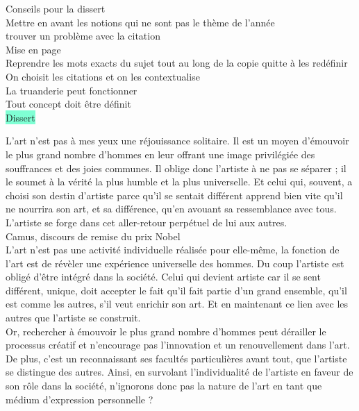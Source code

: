 \documentclass{article}
\begin{document}
\noindent \colorbox{Apricot}{Conseils pour la dissert}\\

\noindent Mettre en avant les notions qui ne sont pas le thème de 
l'année\\ 
trouver un problème avec la citation \\ 
Mise en page \\
Reprendre les mots exacts du sujet tout au long de la copie
quitte à les redéfinir\\ 
On choisit les citations et on les contextualise \\ 
La truanderie peut fonctionner \\ 
Tout concept doit être définit \\ 

\noindent \Large \colorbox{Aquamarine}{Dissert}\\ 

\noindent \large

L’art n’est pas à mes yeux une réjouissance solitaire. 
Il est un moyen d’émouvoir le plus grand nombre d’hommes en leur offrant 
une image privilégiée des souffrances et des joies communes. Il oblige donc
l’artiste à ne pas se séparer ; il le soumet à la vérité la plus humble et 
la plus universelle. Et celui qui, souvent, a choisi son destin d’artiste
parce qu’il se sentait différent apprend bien vite qu’il ne nourrira son 
art, et sa différence, qu’en avouant sa ressemblance avec tous. 
L’artiste se forge dans cet aller-retour perpétuel de lui aux autres.\\ 
Camus, discours de remise du prix Nobel\\

\noindent
L'art n'est pas une activité individuelle réalisée pour elle-même,
la fonction de l'art est de révèler une expérience 
universelle des hommes. Du coup l'artiste est obligé d'être 
intégré dans la société. Celui qui devient artiste car il se 
sent différent, unique, doit accepter le fait qu'il fait partie d'un 
grand ensemble, qu'il est comme les autres, s'il veut enrichir son art. 
Et en maintenant ce lien avec les autres que l'artiste se construit. \\

Or, rechercher à émouvoir le plus grand nombre d'hommes peut dérailler
le processus créatif et n'encourage pas l'innovation et un 
renouvellement dans l'art. De plus, c'est un reconnaissant ses 
facultés particulières avant tout, que l'artiste se distingue des
autres. Ainsi, en survolant l'individualité de l'artiste 
en faveur de son rôle dans la société, n'ignorons donc pas la nature 
de l'art en tant que médium d'expression personnelle ? 
\end{document}
